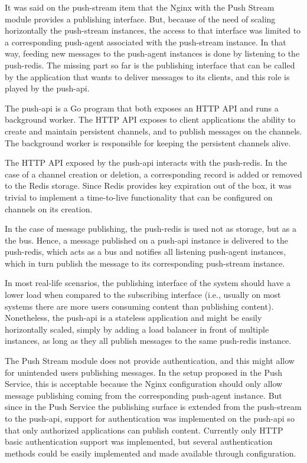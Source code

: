 It was said on the push-stream item that the Nginx with the Push Stream module provides a publishing interface. But, because of the need of scaling horizontally the push-stream instances, the access to that interface was limited to a corresponding push-agent associated with the push-stream instance. In that way, feeding new messages to the push-agent instances is done by listening to the push-redis. The missing part so far is the publishing interface that can be called by the application that wants to deliver messages to its clients, and this role is played by the push-api.

The push-api is a Go program that both exposes an HTTP API and runs a background worker. The HTTP API exposes to client applications the ability to create and maintain persistent channels, and to publish messages on the channels. The background worker is responsible for keeping the persistent channels alive.

The HTTP API exposed by the push-api interacts with the push-redis. In the case of a channel creation or deletion, a corresponding record is added or removed to the Redis storage. Since Redis provides key expiration out of the box, it was trivial to implement a time-to-live functionality that can be configured on channels on its creation.

In the case of message publishing, the push-redis is used not as storage, but as a the bus. Hence, a message published on a push-api instance is delivered to the push-redis, which acts as a bus and notifies all listening push-agent instances, which in turn publish the message to its corresponding push-stream instance.

In most real-life scenarios, the publishing interface of the system should have a lower load when compared to the subscribing interface (i.e., usually on most systems there are more users consuming content than publishing content). Nonetheless, the push-api is a stateless application and might be easily horizontally scaled, simply by adding a load balancer in front of multiple instances, as long as they all publish messages to the same push-redis instance.

The Push Stream module does not provide authentication, and this might allow for unintended users publishing messages. In the setup proposed in the Push Service, this is acceptable because the Nginx configuration should only allow message publishing coming from the corresponding push-agent instance. But since in the Push Service the publishing surface is extended from the push-stream to the push-api, support for authentication was implemented on the push-api so that only authorized applications can publish content. Currently only HTTP basic authentication support was implemented, but several authentication methods could be easily implemented and made available through configuration.

